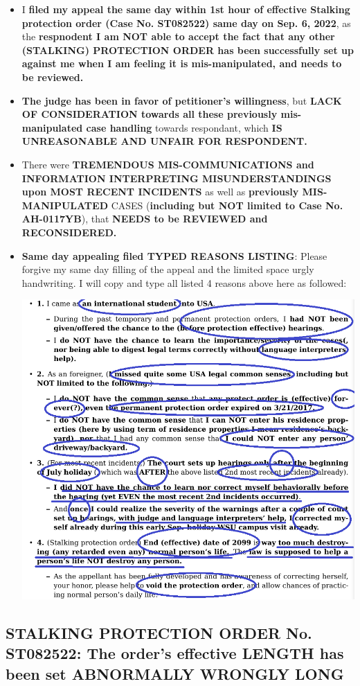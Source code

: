 \documentclass[9pt, b5paper]{article}
\begin{document}
\begin{itemize}
\item I \textbf{filed my appeal the same day within 1st hour of effective Stalking protection order (Case No. ST082522) same day on Sep. 6, 2022}, as the \textbf{respnodent I am NOT able to accept the fact that any other (STALKING) PROTECTION ORDER has been successfully set up against me when I am feeling it is mis-manipulated, and needs to be reviewed.}
\item \textbf{The judge has been in favor of petitioner's willingness}, but \textbf{LACK OF CONSIDERATION towards all these previously mis-manipulated case handling} towards respondant, which \textbf{IS UNREASONABLE AND UNFAIR FOR RESPONDENT.}
\item There were \textbf{TREMENDOUS MIS-COMMUNICATIONS and INFORMATION INTERPRETING MISUNDERSTANDINGS upon MOST RECENT INCIDENTS} as well as \textbf{previously MIS-MANIPULATED} CASES (\textbf{including but NOT limited to Case No. AH-0117YB}), that \textbf{NEEDS to be REVIEWED and RECONSIDERED.}
\item \textbf{Same day appealing filed TYPED REASONS LISTING}: Please forgive my same day filling of the appeal and the limited space urgly handwriting. I will copy and type all listed 4 reasons above here as followed: 

\includegraphics[width=.9\linewidth]{./pic/dearCousin_20220920_093957.png}
\end{itemize}

\subsection{STALKING PROTECTION ORDER No. ST082522: The order's effective LENGTH has been set ABNORMALLY WRONGLY LONG}
\label{sec-1-1}
\end{document}
